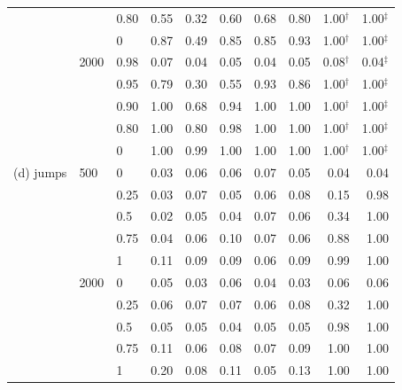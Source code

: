 \begin{tabular}{lllrrrrrrr}
 &  & 0.80 & 0.55 & 0.32 & 0.60 & 0.68 & 0.80 & 1.00$^{\dagger}$ & 1.00$^{\ddagger}$ \\
 &  & 0 & 0.87 & 0.49 & 0.85 & 0.85 & 0.93 & 1.00$^{\dagger}$ & 1.00$^{\ddagger}$ \\
 & 2000 & 0.98 & 0.07 & 0.04 & 0.05 & 0.04 & 0.05 & 0.08$^{\dagger}$ & 0.04$^{\ddagger}$ \\
 &  & 0.95 & 0.79 & 0.30 & 0.55 & 0.93 & 0.86 & 1.00$^{\dagger}$ & 1.00$^{\ddagger}$ \\
 &  & 0.90 & 1.00 & 0.68 & 0.94 & 1.00 & 1.00 & 1.00$^{\dagger}$ & 1.00$^{\ddagger}$ \\
 &  & 0.80 & 1.00 & 0.80 & 0.98 & 1.00 & 1.00 & 1.00$^{\dagger}$ & 1.00$^{\ddagger}$ \\
 &  & 0 & 1.00 & 0.99 & 1.00 & 1.00 & 1.00 & 1.00$^{\dagger}$ & 1.00$^{\ddagger}$ \\
(d) jumps & 500 & 0 & 0.03 & 0.06 & 0.06 & 0.07 & 0.05 & 0.04 & 0.04 \\
 &  & 0.25 & 0.03 & 0.07 & 0.05 & 0.06 & 0.08 & 0.15 & 0.98 \\
 &  & 0.5 & 0.02 & 0.05 & 0.04 & 0.07 & 0.06 & 0.34 & 1.00 \\
 &  & 0.75 & 0.04 & 0.06 & 0.10 & 0.07 & 0.06 & 0.88 & 1.00 \\
 &  & 1 & 0.11 & 0.09 & 0.09 & 0.06 & 0.09 & 0.99 & 1.00 \\
 & 2000 & 0 & 0.05 & 0.03 & 0.06 & 0.04 & 0.03 & 0.06 & 0.06 \\
 &  & 0.25 & 0.06 & 0.07 & 0.07 & 0.06 & 0.08 & 0.32 & 1.00 \\
 &  & 0.5 & 0.05 & 0.05 & 0.04 & 0.05 & 0.05 & 0.98 & 1.00 \\
 &  & 0.75 & 0.11 & 0.06 & 0.08 & 0.07 & 0.09 & 1.00 & 1.00 \\
 &  & 1 & 0.20 & 0.08 & 0.11 & 0.05 & 0.13 & 1.00 & 1.00 \\
\bottomrule
\end{tabular}
